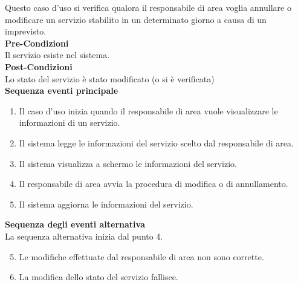 \documentclass[green, fancy, 11pt]{elegantbook}
\begin{document}
Questo caso d’uso si verifica qualora il responsabile di area voglia annullare o modificare un servizio stabilito in un determinato giorno a causa di un imprevisto.\\
\textbf{Pre-Condizioni}\\
Il servizio esiste nel sistema.\\
\textbf{Post-Condizioni}\\
Lo stato del servizio è stato modificato (o si è verificata)\\
\textbf{Sequenza eventi principale}
\begin{enumerate}
	\item Il caso d’uso inizia quando il responsabile di area vuole visualizzare le informazioni di un servizio.
	\item Il sistema legge le informazioni del servizio scelto dal responsabile di area.
	\item Il sistema visualizza a schermo le informazioni del servizio.
	\item Il responsabile di area avvia la procedura di modifica o di annullamento.
	\item Il sistema aggiorna le informazioni del servizio.
\end{enumerate}
\textbf{Sequenza degli eventi alternativa}\\
La sequenza alternativa inizia dal punto 4.
\begin{enumerate}
	\setcounter{enumi}{4}
	\item Le modifiche effettuate dal responsabile di area non sono corrette.
	\item La modifica dello stato del servizio fallisce.
\end{enumerate}
\end{document}
